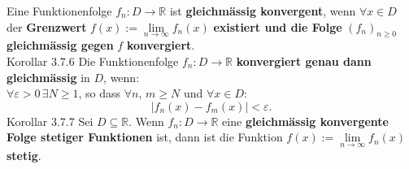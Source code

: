 \documentclass[landscape, 10pt]{article}
\newcommand{\R}{\mathbb{R}}
\begin{document}
\begin{multicols}{3}
                     Eine Funktionenfolge 
                     \textcolor{NavyBlue}{$f_n:D\longrightarrow\R$}
                     ist \textbf{gleichmässig konvergent}, wenn 
                     \textcolor{NavyBlue}{$\forall x\in D$} der 
                     \textbf{Grenzwert} 
                     \textcolor{NavyBlue}{
                     $f(x):=\lim\limits_{n\to\infty}f_n(x)$}
                     \textbf{existiert und die Folge}
                     \textcolor{NavyBlue}{$(f_n)_{n\geqslant0}$} 
                     \textbf{gleichmässig gegen} 
                     \textcolor{NavyBlue}{$f$} 
                     \textbf{konvergiert}.\\
              \colorbox{BurntOrange}{Korollar 3.7.6} 
                     Die Funktionenfolge 
                     \textcolor{NavyBlue}{
                     $f_n:D\longrightarrow\R$}
                     \textbf{konvergiert genau 
                     dann gleichmässig} in $D$, wenn: \\
                     \textcolor{NavyBlue}{
                     $\forall\varepsilon>0\,\exists N\geqslant1$}, 
                     so dass 
                     \textcolor{NavyBlue}{$\forall n$},
                     \textcolor{NavyBlue}{$m\geqslant N$} und 
                     \textcolor{NavyBlue}{
                     $\forall x\in D:$}
                     \begin{equation*}
                           |f_n(x)-f_m(x)|<\varepsilon. 
                     \end{equation*}
              \colorbox{BurntOrange}{Korollar 3.7.7} 
                     Sei \textcolor{NavyBlue}{$D\subseteq\R$}. 
                     Wenn 
                     \textcolor{NavyBlue}{$f_n:D\longrightarrow\R$} 
                     eine \textbf{gleichmässig konvergente Folge 
                     stetiger Funktionen} ist, 
                     dann ist die Funktion 
                     \textcolor{NavyBlue}{
                     $f(x):=\lim\limits_{n\to\infty}f_n(x)$} 
                     \textbf{stetig}.\\


\end{multicols}
\end{document}
